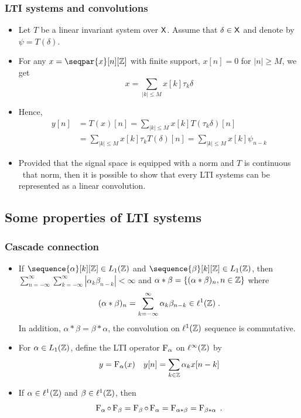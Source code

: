 \begin{frame}
\frametitle{LTI systems and convolutions}
\begin{itemize}
\item Let $T$ be a linear invariant system over $\mathsf{X}$. Assume that $\delta \in \mathsf{X}$ and denote by $\psi= T(\delta)$.
\item For any $x = \seqpar{x}[n][\zset]$ with \alert{finite support}, $x[n] = 0$ for $|n| \geq M$, we get
\[
x= \sum_{|k|\leq M} x[k] \tau_k \delta
\]
\item Hence,
\begin{align*}
y[n]&= T(x)[n]= \sum_{|k|\leq M} x[k] T(\tau_k \delta)[n] \\
&= \sum_{|k| \leq M} x[k] \tau_k T(\delta) [n]= \sum_{|k|\leq M} x[k] \psi_{n-k}
\end{align*}
\item Provided that the signal space is equipped with a norm and $T$ is continuous \wrt\ that norm, then it is possible to show that
every LTI systems can be represented as a \alert{linear convolution}.
\end{itemize}
\end{frame}
\subsection{Some properties of LTI systems}
\begin{frame}
\frametitle{Cascade connection}
\begin{itemize}
\item If $\sequence{\alpha}[k][\zset] \in \lone(\zset)$ and $\sequence{\beta}[k][\zset] \in \lone(\zset)$, then $\sum_{n = -\infty}^\infty \sum_{k= -\infty}^{\infty} |\alpha_k \beta_{n-k}| < \infty$ and $\alpha * \beta = \{( \alpha * \beta)_n, n \in \mathbb{Z}\}$ where
    \[
    (\alpha * \beta)_n = \sum_{k=-\infty}^{\infty} \alpha_k \beta_{n-k} \in \ell^1(\mathbb{Z}) \;.
    \]
In addition, $\alpha * \beta= \beta * \alpha$, the convolution on $\ell^1(\mathbb{Z})$ sequence is commutative.
\item For $\alpha \in L_1(\mathbb{Z})$, define the LTI operator $\operatorname{F}_{\alpha}$ on $\ell^\infty(\mathbb{Z})$ by
\[
y= \operatorname{F}_{\alpha}(x)   \quad y[n]= \sum_{k \in \mathbb{Z}} \alpha_k x[n-k]
\]
\item If $\alpha \in \ell^1(\mathbb{Z})$ and $\beta \in \ell^1(\mathbb{Z})$, then
\alert{
\[
\operatorname{F}_{\alpha} \circ \operatorname{F}_{\beta} = \operatorname{F}_{\beta} \circ \operatorname{F}_{\alpha} = \operatorname{F}_{\alpha * \beta} = \operatorname{F}_{\beta * \alpha}\;.
\]
}
\end{itemize}
\end{frame}

